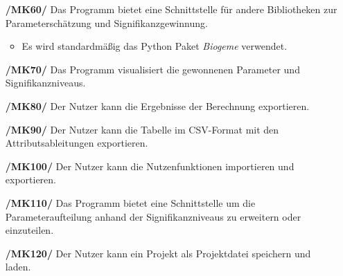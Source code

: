 \documentclass{article}
\begin{document}
\begin{itemize}
    \item[\textbf{/MK60/}] Das Programm bietet eine Schnittstelle für andere Bibliotheken zur Parameterschätzung und Signifikanzgewinnung. 
    \begin{itemize}
        \item Es wird standardmäßig das Python Paket \emph{Biogeme} verwendet.
    \end{itemize}
    \item[\textbf{/MK70/}] Das Programm visualisiert die gewonnenen Parameter und Signifikanzniveaus.
    \item[\textbf{/MK80/}] Der Nutzer kann die Ergebnisse der Berechnung  exportieren.
    \item[\textbf{/MK90/}] Der Nutzer kann die Tabelle im CSV-Format mit den Attributsableitungen exportieren.
    \item[\textbf{/MK100/}] Der Nutzer kann die Nutzenfunktionen importieren und exportieren.
    \item[\textbf{/MK110/}] Das Programm bietet eine Schnittstelle um die Parameteraufteilung anhand der Signifikanzniveaus zu erweitern oder einzuteilen.
    \item[\textbf{/MK120/}] Der Nutzer kann ein Projekt als Projektdatei speichern und laden.
\end{itemize}
\end{document}

